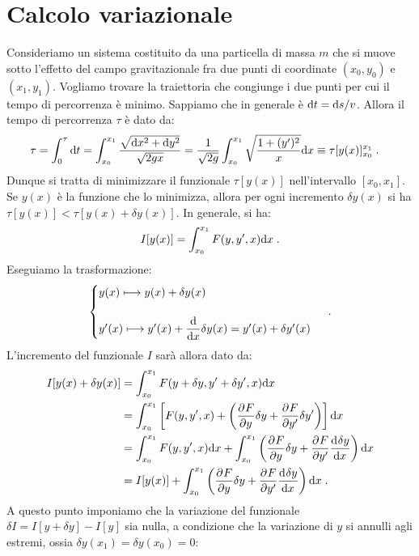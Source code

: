 \section{Calcolo variazionale}
Consideriamo un sistema costituito da una particella di massa $m$ che si muove sotto l'effetto del campo gravitazionale fra due punti di coordinate $(x_0,y_0)$ e $(x_1,y_1)$. Vogliamo trovare la traiettoria che congiunge i due punti per cui il tempo di percorrenza è minimo. Sappiamo che in generale è $\diff[t]=\diff[s]/v$. Allora il tempo di percorrenza $\tau$ è dato da:
\begin{align}
\tau &=\int_0^{\tau}\diff{t}=\int_{x_0}^{x_1}\frac{\sqrt{\diff{x}^2+\diff{y}^2}}{\sqrt{2gx}}=\frac{1}{\sqrt{2g}}\int_{x_0}^{x_1}\sqrt{\frac{1+(y')^2}{x}}\diff{x}\equiv\tau[y(x)]^{x_1}_{x_0}\;.
\end{align}
Dunque si tratta di minimizzare il funzionale $\tau[y(x)]$ nell'intervallo $[x_0,x_1]$. Se $y(x)$ è la funzione che lo minimizza, allora per ogni incremento $\delta y(x)$ si ha $\tau[y(x)]<\tau[y(x)+\delta y(x)]$. In generale, si ha:
\begin{equation}
I[y(x)]=\int_{x_0}^{x_1} F(y,y',x)\diff[x]\;.
\end{equation}
Eseguiamo la trasformazione:
\begin{equation}
\begin{cases}
y(x)\longmapsto y(x)+\delta y(x) \\
\\
y'(x)\longmapsto y'(x)+\dfrac{\diff}{\diff[x]}\delta y(x)=y'(x)+\delta y'(x)
\end{cases}\;.
\end{equation}
L'incremento del funzionale $I$ sarà allora dato da:
\begin{align}
I[y(x)+\delta y(x)] &= \int_{x_0}^{x_1}F(y+\delta y, y'+\delta y', x)\diff{x} \notag \\
&= \int_{x_0}^{x_1}\left[F(y,y',x)+\left(\pdev{F}{y}\delta y+\pdev{F}{y'}\delta y'\right)\right]\diff{x} \notag \\
&= \int_{x_0}^{x_1}F(y,y',x)\diff{x}+\int_{x_0}^{x_1}\left(\pdev{F}{y}\delta y+\pdev{F}{y'}\dev{\delta y}{x}\right)\diff{x} \notag \\
&= I[y(x)]+\int_{x_0}^{x_1}\left(\pdev{F}{y}\delta y+\pdev{F}{y'}\dev{\delta y}{x}\right)\diff{x}\;.
\end{align}
A questo punto imponiamo che la variazione del funzionale $\delta I=I[y+\delta y]-I[y]$ sia nulla, a condizione che la variazione di $y$ si annulli agli estremi, ossia $\delta y(x_1)=\delta y(x_0)=0$:
